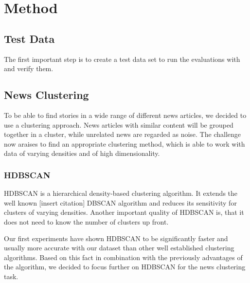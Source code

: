 \section{Method}



\subsection{Test Data}

The first important step is to create a test data set to run the evaluations with and verify them.


\subsection{News Clustering}

To be able to find stories in a wide range of different news articles, we decided to use a clustering approach. News articles with similar content will be grouped together in a cluster, while unrelated news are regarded as noise. The challenge now araises to find an appropriate clustering method, which is able to work with data of varying densities and of high dimensionality.

\subsubsection{HDBSCAN}

HDBSCAN is a hierarchical density-based clustering algorithm. It extends the well known [insert citation] DBSCAN algorithm and reduces its sensitivity for clusters of varying densities. Another important quality of HDBSCAN is, that it does not need to know the number of clusters up front.


Our first experiments have shown HDBSCAN to be significantly faster and usually more accurate with our dataset than other well established clustering algorithms. Based on this fact in combination with the previously advantages of the algorithm, we decided to focus further on HDBSCAN for the news clustering task.


